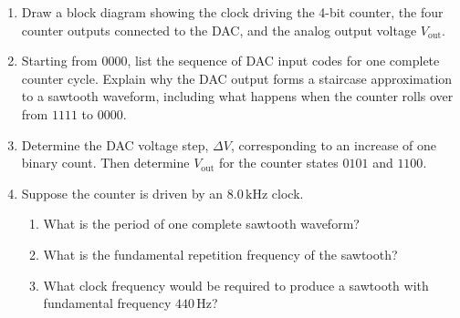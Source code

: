 \documentclass[10pt]{article}
\begin{document}
\begin{enumerate}
\item Draw a block diagram showing the clock driving the 4-bit counter, the four counter outputs connected to the DAC, and the analog output voltage $V_{\mathrm{out}}$. \\ \vspace{2cm}

\item Starting from $0000$, list the sequence of DAC input codes for one complete counter cycle. Explain why the DAC output forms a staircase approximation to a sawtooth waveform, including what happens when the counter rolls over from $1111$ to $0000$. \\ \vspace{2cm}

\item Determine the DAC voltage step, $\Delta V$, corresponding to an increase of one binary count. Then determine $V_{\mathrm{out}}$ for the counter states $0101$ and $1100$. \\ \vspace{2cm}

\item Suppose the counter is driven by an $8.0\,\mathrm{kHz}$ clock.
\begin{enumerate}
\item What is the period of one complete sawtooth waveform?
\item What is the fundamental repetition frequency of the sawtooth?
\item What clock frequency would be required to produce a sawtooth with fundamental frequency $440\,\mathrm{Hz}$?
\end{enumerate}
\vspace{2cm}
\end{enumerate}

\begin{center}
\end{center}
\end{document}
